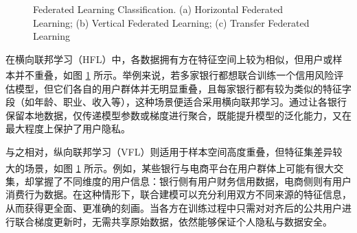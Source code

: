 \vspace{-0.1cm}
\begin{figure}[!h]
	\centering
	\hspace{0.01\textwidth}
	\hspace{0.01\textwidth}
	
	{\centering \wuhao Federated Learning Classification. (a) Horizontal Federated Learning; (b) Vertical Federated Learning; (c) Transfer Federated Learning}	
	\label{fig:FedClass}
\end{figure}
\vspace{-0.35cm}
在横向联邦学习（HFL）中，各数据拥有方在特征空间上较为相似，但用户或样本并不重叠\textsuperscript{\cite{yang2019federated,liu2019communication}}，如图 \ref{fig:FedClass} 所示。举例来说，若多家银行都想联合训练一个信用风险评估模型，但它们各自的用户群体并无明显重叠，且每家银行都有较为类似的特征字段（如年龄、职业、收入等），这种场景便适合采用横向联邦学习。通过让各银行保留本地数据，仅传递模型参数或梯度进行聚合，既能提升模型的泛化能力，又在最大程度上保护了用户隐私。

与之相对，纵向联邦学习（VFL）则适用于样本空间高度重叠，但特征集差异较大的场景\textsuperscript{\cite{liu2020secure,chen2020vafl}}，如图 \ref{fig:FedClass} 所示。例如，某些银行与电商平台在用户群体上可能有很大交集，却掌握了不同维度的用户信息：银行侧有用户财务信用数据，电商侧则有用户消费行为数据。在这种情形下，联合建模可以充分利用双方不同来源的特征信息，从而获得更全面、更准确的刻画。当各方在训练过程中只需对对齐后的公共用户进行联合梯度更新时，无需共享原始数据，依然能够保证个人隐私与数据安全。

